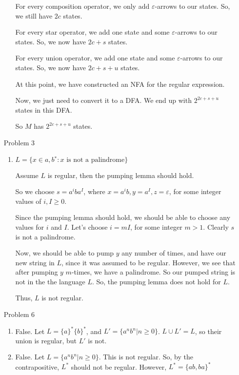 \documentclass[12pt,letterpaper]{article}
\begin{document}
\begin{enumerate}
\begin{enumerate}
          For every composition operator, we only add $\varepsilon$-arrows to our states.
          So, we still have $2c$ states.

          For every star operator, we add one state and some $\varepsilon$-arrows to our states.
          So, we now have $2c + s$ states.

          For every union operator, we add one state and some $\varepsilon$-arrows to our states.
          So, we now have $2c + s + u$ states.

          At this point, we have constructed an NFA for the regular expression.

          Now, we just need to convert it to a DFA.
          We end up with $2^{2c + s + u}$ states in this DFA.

          So $M$ has $2^{2c + s + u}$ states.
      \end{enumerate}

    \pagebreak

    \item[Problem 3]
      \begin{enumerate}
        \item $L = \{x \in {a, b}^∗ : x \text{ is not a palindrome}\}$

          Assume $L$ is regular, then the pumping lemma should hold.

          So we choose $s = a^iba^I$, where $x = a^ib, y = a^I, z = \varepsilon$, for some integer values of $i, I \ge 0$.

          Since the pumping lemma should hold, we should be able to choose any values for $i$ and $I$.
          Let's choose $i = mI$, for some integer $m > 1$.
          Clearly $s$ is not a palindrome.

          Now, we should be able to pump $y$ any number of times, and have our new string in $L$, since it was assumed to be regular.
          However, we see that after pumping $y$ $m$-times, we have a palindrome.
          So our pumped string is not in the the language $L$.
          So, the pumping lemma does not hold for $L$.

          Thus, $L$ is not regular.
      \end{enumerate}

    \item[Problem 6]
      \begin{enumerate}
        \item False.
          Let $L = \{a\}^*\{b\}^*$, and $L' = \{a^nb^n | n \ge 0\}$.
          $L \cup L' = L$, so their union is regular, but $L'$ is not.

        \item False.
          Let $L = \{a^nb^n | n \ge 0\}$.
          This is not regular.
          So, by the contrapositive, $L^*$ should not be regular.
          However, $L^* = \{ab, ba\}^*$
      \end{enumerate}
  \end{enumerate}
\end{document}
